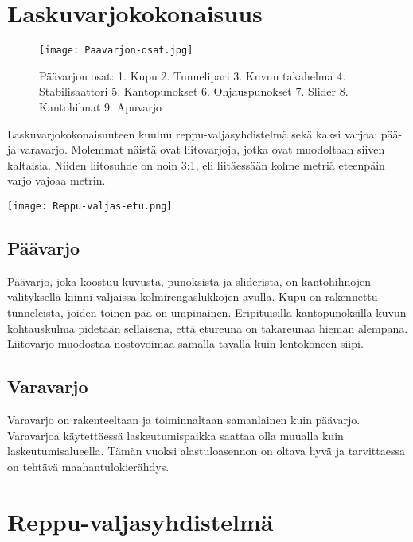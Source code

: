 \section{ Laskuvarjokokonaisuus }
\label{laskuvarjokalusto-ja-hyppyvarusteet-laskuvarjokokonaisuus}


\begin{figure*}[]\centering\texttt{[image: Paavarjon-osat.jpg]}\caption{Päävarjon osat: 1. Kupu 2. Tunnelipari 3. Kuvun takahelma 4. Stabilisaattori 5. Kantopunokset 6. Ohjauspunokset 7. Slider 8. Kantohihnat 9. Apuvarjo}\end{figure*} 


Laskuvarjokokonaisuuteen kuuluu reppu-valjasyhdistelmä sekä kaksi varjoa: pää- ja varavarjo. Molemmat näistä ovat liitovarjoja, jotka ovat muodoltaan siiven kaltaisia. Niiden liitosuhde on noin 3:1, eli liitäessään kolme metriä eteenpäin varjo vajoaa metrin.  


\begin{Figure}\centering\texttt{[image: Reppu-valjas-etu.png]}\end{Figure} 

\subsection{ Päävarjo }
\label{laskuvarjokalusto-ja-hyppyvarusteet-paavarjo}


Päävarjo, joka koostuu kuvusta, punoksista ja sliderista, on kantohihnojen välityksellä kiinni valjaissa kolmirengaslukkojen avulla. Kupu on rakennettu tunneleista, joiden toinen pää on umpinainen. Eripituisilla kantopunoksilla kuvun kohtauskulma pidetään sellaisena, että etureuna on takareunaa hieman alempana. Liitovarjo muodostaa nostovoimaa samalla tavalla kuin lentokoneen siipi. 

\subsection{ Varavarjo }
\label{laskuvarjokalusto-ja-hyppyvarusteet-varavarjo}


Varavarjo on rakenteeltaan ja toiminnaltaan samanlainen kuin päävarjo. Varavarjoa käytettäessä laskeutumispaikka saattaa olla muualla kuin laskeutumisalueella. Tämän vuoksi alastuloasennon on oltava hyvä ja tarvittaessa on tehtävä maahantulokierähdys. 

\section{ Reppu-valjasyhdistelmä }
\label{laskuvarjokalusto-ja-hyppyvarusteet-reppu-valjasyhdistelma}


